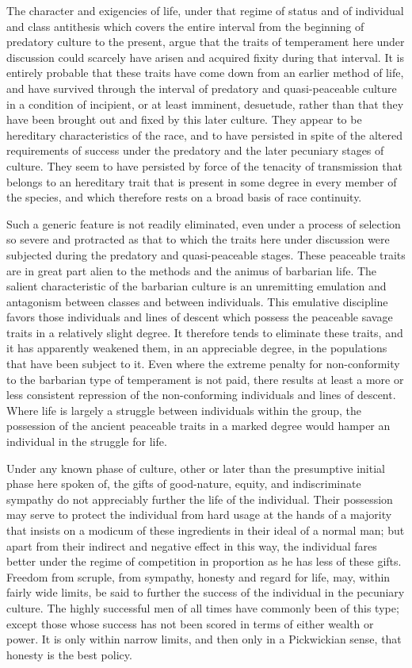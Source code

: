 \documentclass[12pt]{report}
\begin{document}
The character and exigencies of life, under that regime of status and
of individual and class antithesis which covers the entire interval from
the beginning of predatory culture to the present, argue that the traits
of temperament here under discussion could scarcely have arisen and
acquired fixity during that interval. It is entirely probable that these
traits have come down from an earlier method of life, and have survived
through the interval of predatory and quasi-peaceable culture in a
condition of incipient, or at least imminent, desuetude, rather than
that they have been brought out and fixed by this later culture.
They appear to be hereditary characteristics of the race, and to have
persisted in spite of the altered requirements of success under the
predatory and the later pecuniary stages of culture. They seem to have
persisted by force of the tenacity of transmission that belongs to an
hereditary trait that is present in some degree in every member of the
species, and which therefore rests on a broad basis of race continuity.

Such a generic feature is not readily eliminated, even under a process
of selection so severe and protracted as that to which the traits here
under discussion were subjected during the predatory and quasi-peaceable
stages. These peaceable traits are in great part alien to the methods
and the animus of barbarian life. The salient characteristic of the
barbarian culture is an unremitting emulation and antagonism between
classes and between individuals. This emulative discipline favors those
individuals and lines of descent which possess the peaceable savage
traits in a relatively slight degree. It therefore tends to eliminate
these traits, and it has apparently weakened them, in an appreciable
degree, in the populations that have been subject to it. Even where the
extreme penalty for non-conformity to the barbarian type of temperament
is not paid, there results at least a more or less consistent repression
of the non-conforming individuals and lines of descent. Where life is
largely a struggle between individuals within the group, the possession
of the ancient peaceable traits in a marked degree would hamper an
individual in the struggle for life.

Under any known phase of culture, other or later than the presumptive
initial phase here spoken of, the gifts of good-nature, equity, and
indiscriminate sympathy do not appreciably further the life of the
individual. Their possession may serve to protect the individual from
hard usage at the hands of a majority that insists on a modicum of
these ingredients in their ideal of a normal man; but apart from their
indirect and negative effect in this way, the individual fares better
under the regime of competition in proportion as he has less of these
gifts. Freedom from scruple, from sympathy, honesty and regard for life,
may, within fairly wide limits, be said to further the success of the
individual in the pecuniary culture. The highly successful men of all
times have commonly been of this type; except those whose success has
not been scored in terms of either wealth or power. It is only within
narrow limits, and then only in a Pickwickian sense, that honesty is the
best policy.
\end{document}
